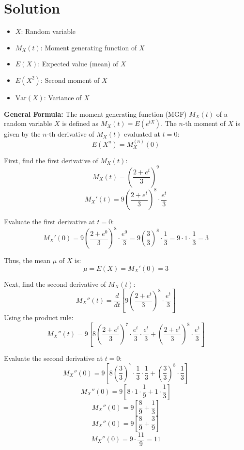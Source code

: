 \documentclass[12pt]{article}
\begin{document}
\section*{Solution}
\begin{itemize}
  \item \( X \): Random variable
  \item \( M_X(t) \): Moment generating function of \( X \)
  \item \( E(X) \): Expected value (mean) of \( X \)
  \item \( E(X^2) \): Second moment of \( X \)
  \item \( \text{Var}(X) \): Variance of \( X \)
\end{itemize}
\textbf{General Formula:}
The moment generating function (MGF) \( M_X(t) \) of a random variable \( X \) is defined as \( M_X(t) = E(e^{tX}) \). The \( n \)-th moment of \( X \) is given by the \( n \)-th derivative of \( M_X(t) \) evaluated at \( t = 0 \):
\[ E(X^n) = M_X^{(n)}(0) \]

First, find the first derivative of \( M_X(t) \):
\[ M_X(t) = \left(\frac{2+e^t}{3}\right)^9 \]
\[ M_X'(t) = 9 \left(\frac{2+e^t}{3}\right)^8 \cdot \frac{e^t}{3} \]

Evaluate the first derivative at \( t = 0 \):
\[ M_X'(0) = 9 \left(\frac{2+e^0}{3}\right)^8 \cdot \frac{e^0}{3} = 9 \left(\frac{3}{3}\right)^8 \cdot \frac{1}{3} = 9 \cdot 1 \cdot \frac{1}{3} = 3 \]

Thus, the mean \( \mu \) of \( X \) is:
\[ \mu = E(X) = M_X'(0) = 3 \]

Next, find the second derivative of \( M_X(t) \):
\[ M_X''(t) = \frac{d}{dt} \left[ 9 \left(\frac{2+e^t}{3}\right)^8 \cdot \frac{e^t}{3} \right] \]
Using the product rule:
\[ M_X''(t) = 9 \left[ 8 \left(\frac{2+e^t}{3}\right)^7 \cdot \frac{e^t}{3} \cdot \frac{e^t}{3} + \left(\frac{2+e^t}{3}\right)^8 \cdot \frac{e^t}{3} \right] \]

Evaluate the second derivative at \( t = 0 \):
\[ M_X''(0) = 9 \left[ 8 \left(\frac{3}{3}\right)^7 \cdot \frac{1}{3} \cdot \frac{1}{3} + \left(\frac{3}{3}\right)^8 \cdot \frac{1}{3} \right] \]
\[ M_X''(0) = 9 \left[ 8 \cdot 1 \cdot \frac{1}{9} + 1 \cdot \frac{1}{3} \right] \]
\[ M_X''(0) = 9 \left[ \frac{8}{9} + \frac{1}{3} \right] \]
\[ M_X''(0) = 9 \left[ \frac{8}{9} + \frac{3}{9} \right] \]
\[ M_X''(0) = 9 \cdot \frac{11}{9} = 11 \]
\end{document}
